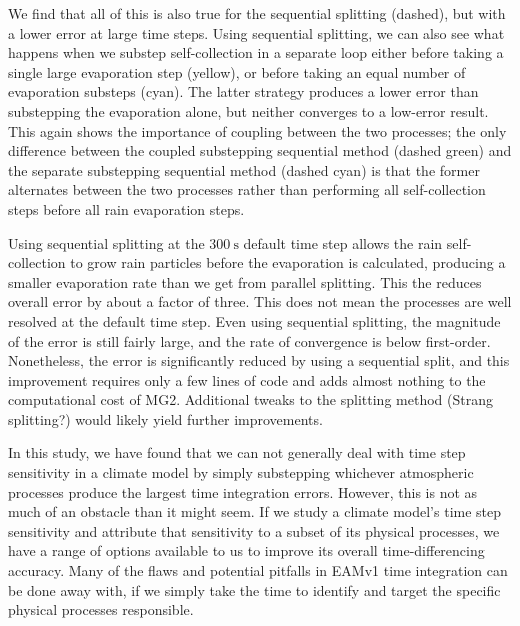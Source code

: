 \documentclass [11pt, proquest] {uwthesis}[2020/02/24]
\begin{document}
We find that all of this is also true for the sequential splitting (dashed), but with a lower error at large time steps. Using sequential splitting, we can also see what happens when we substep self-collection in a separate loop either before taking a single large evaporation step (yellow), or before taking an equal number of evaporation substeps (cyan). The latter strategy produces a lower error than substepping the evaporation alone, but neither converges to a low-error result. This again shows the importance of coupling between the two processes; the only difference between the coupled substepping sequential method (dashed green) and the separate substepping sequential method (dashed cyan) is that the former alternates between the two processes rather than performing all self-collection steps before all rain evaporation steps.

Using sequential splitting at the $\SI{300}{\second}$ default time step allows the rain self-collection to grow rain particles before the evaporation is calculated, producing a smaller evaporation rate than we get from parallel splitting. This the reduces overall error by about a factor of three. This does not mean the processes are well resolved at the default time step. Even using sequential splitting, the magnitude of the error is still fairly large, and the rate of convergence is below first-order. Nonetheless, the error is significantly reduced by using a sequential split, and this improvement requires only a few lines of code and adds almost nothing to the computational cost of MG2. Additional tweaks to the splitting method (Strang splitting?) would likely yield further improvements.

In this study, we have found that we can not generally deal with time step sensitivity in a climate model by simply substepping whichever atmospheric processes produce the largest time integration errors. However, this is not as much of an obstacle than it might seem. If we study a climate model's time step sensitivity and attribute that sensitivity to a subset of its physical processes, we have a range of options available to us to improve its overall time-differencing accuracy. Many of the flaws and potential pitfalls in EAMv1 time integration can be done away with, if we simply take the time to identify and target the specific physical processes responsible.

\printendnotes

%
%
%
\printbibliography[heading=bibintoc]
%
%
\appendix
\raggedbottom\sloppy
 
\end{document}
